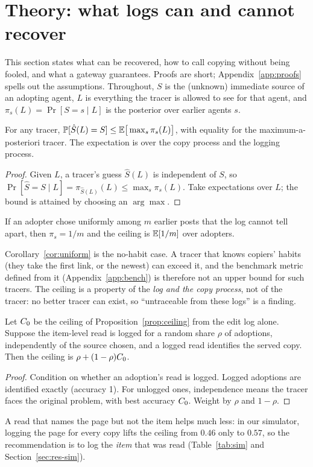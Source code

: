\section{Theory: what logs can and cannot recover}\label{sec:theory}

This section states what can be recovered, how to call copying without being fooled, and what a gateway guarantees. Proofs are short; Appendix~\ref{app:proofs} spells out the assumptions. Throughout, $S$ is the (unknown) immediate source of an adopting agent, $L$ is everything the tracer is allowed to see for that agent, and $\pi_s(L)=\Pr[S=s\mid L]$ is the posterior over earlier agents $s$.

\begin{proposition}[Ceiling]\label{prop:ceiling}
For any tracer, $\mathbb{P}[\hat S(L)=S]\le \mathbb{E}\big[\max_s \pi_s(L)\big]$, with equality for the maximum-a-posteriori tracer. The expectation is over the copy process and the logging process.
\end{proposition}
\begin{proof}
Given $L$, a tracer's guess $\hat S(L)$ is independent of $S$, so $\Pr[\hat S=S\mid L]=\pi_{\hat S(L)}(L)\le\max_s\pi_s(L)$. Take expectations over $L$; the bound is attained by choosing an $\arg\max$.
\end{proof}
\begin{corollary}\label{cor:uniform}
If an adopter chose uniformly among $m$ earlier posts that the log cannot tell apart, then $\pi_s=1/m$ and the ceiling is $\mathbb{E}[1/m]$ over adopters.
\end{corollary}
Corollary~\ref{cor:uniform} is the no-habit case. A tracer that knows copiers' habits (they take the first link, or the newest) can exceed it, and the benchmark metric defined from it (Appendix~\ref{app:bench}) is therefore not an upper bound for such tracers. The ceiling is a property of the \emph{log and the copy process}, not of the tracer: no better tracer can exist, so ``untraceable from these logs'' is a finding.

\begin{proposition}[Reads]\label{prop:reads}
Let $C_0$ be the ceiling of Proposition~\ref{prop:ceiling} from the edit log alone. Suppose the item-level read is logged for a random share $\rho$ of adoptions, independently of the source chosen, and a logged read identifies the served copy. Then the ceiling is $\rho+(1-\rho)C_0$.
\end{proposition}
\begin{proof}
Condition on whether an adoption's read is logged. Logged adoptions are identified exactly (accuracy 1). For unlogged ones, independence means the tracer faces the original problem, with best accuracy $C_0$. Weight by $\rho$ and $1-\rho$.
\end{proof}
A read that names the page but not the item helps much less: in our simulator, logging the page for every copy lifts the ceiling from $0.46$ only to $0.57$, so the recommendation is to log the \emph{item} that was read (Table~\ref{tab:sim} and Section~\ref{sec:res-sim}).


